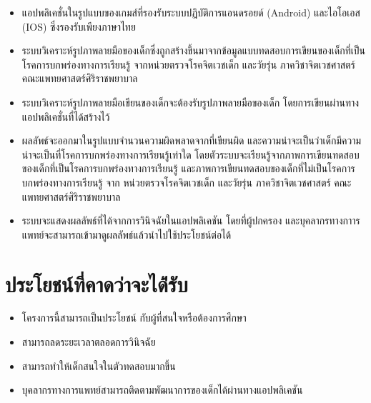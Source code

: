 \documentclass[12pt,oneside,openright,a4paper]{cpe-thai-project}
\begin{document}
\begin{itemize}
\item  แอปพลิเคชั่นในรูปแบบของเกมส์ที่รองรับระบบปฏิบัติการแอนดรอยด์ (Android) และไอโอเอส (IOS) ซึ่งรองรับเพียงภาษาไทย 
\item  ระบบวิเคราะห์รูปภาพลายมือของเด็กซึ่งถูกสร้างขึ้นมาจากข้อมูลแบบทดสอบการเขียนของเด็กที่เป็นโรคการบกพร่องทางการเรียนรู้ จากหน่วยตรวจโรคจิตเวชเด็ก และวัยรุ่น ภาควิชาจิตเวชศาสตร์ คณะแพทยศาสตร์ศิริราชพยาบาล
\item  ระบบวิเคราะห์รูปภาพลายมือเขียนของเด็กจะต้องรับรูปภาพลายมือของเด็ก โดยการเขียนผ่านทางแอปพลิเคชั่นที่ได้สร้างไว้
\item  ผลลัพธ์จะออกมาในรูปแบบจำนวนความผิดพลาดจากที่เขียนผิด และความน่าจะเป็นว่าเด็กมีความน่าจะเป็นที่โรคการบกพร่องทางการเรียนรู้เท่าใด โดยตัวระบบจะเรียนรู้จากภาพการเขียนทดสอบของเด็กที่เป็นโรคการบกพร่องทางการเรียนรู้ และภาพการเขียนทดสอบของเด็กที่ไม่เป็นโรคการบกพร่องทางการเรียนรู้ จาก หน่วยตรวจโรคจิตเวชเด็ก และวัยรุ่น ภาควิชาจิตเวชศาสตร์ คณะแพทยศาสตร์ศิริราชพยาบาล
\item  ระบบจะแสดงผลลัพธ์ที่ได้จากการวินิจฉัยในแอปพลิเคชัน โดยที่ผู้ปกครอง และบุคลากรทางกาารแพทย์จะสามารถเข้ามาดูผลลัพธ์แล้วนำไปใช้ประโยชน์ต่อได้
\end{itemize}

\section{ประโยชน์ที่คาดว่าจะได้่รับ}
\begin{itemize}
  \item โครงการนี้สามารถเป็นประโยชน์ กับผู้ที่สนใจหรือต้องการศึกษา
  \item สามารถลดระยะเวลาตลอดการวินิจฉัย
  \item สามารถทำให้เด็กสนใจในตัวทดสอบมากขึ้น
  \item บุคลากรทางการแพทย์สามารถติดตามพัฒนาการของเด็กได้ผ่านทางแอปพลิเคชัน
\end{itemize}
\end{document}
